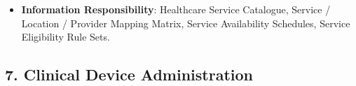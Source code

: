 \begin{itemize}
\begin{itemize}
\begin{itemize}
\end{itemize}


\item
\textbf{Feature: Operating Schedule Specification}:


\begin{itemize}

\item
\emph{Function}: \texttt{} — Governs regular operating hours, emergency intake availability, and seasonal clinic schedules.



\item
\emph{Exposed Service}: \texttt{} — Discloses operational intake hours and open status.



\end{itemize}


\item
\textbf{Feature: Eligibility \& Catchment Specification}:


\begin{itemize}

\item
\emph{Function}: \texttt{} — Configures catchment criteria, age thresholds, referral requirements, and clinical indications for service access.



\item
\emph{Exposed Service}: \texttt{} — Evaluates referral eligibility for intake coordinators.



\end{itemize}


\end{itemize}


\item
\textbf{Information Responsibility}: Healthcare Service Catalogue, Service /\allowbreak{} Location /\allowbreak{} Provider Mapping Matrix, Service Availability Schedules, Service Eligibility Rule Sets.



\end{itemize}
\label{rad:em:187}

\par\smallskip
{}\label{rad:em:189}
\subsection*{7. Clinical Device Administration}
\label{rad:em:191}

